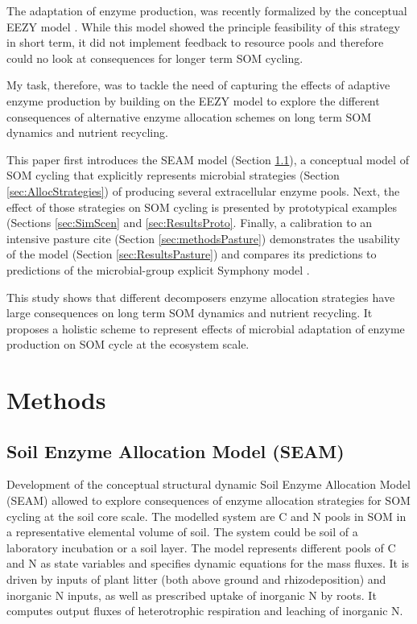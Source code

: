 The adaptation of enzyme production, was recently
formalized by the conceptual EEZY model \citep{Moorhead12}. While this model
showed the principle feasibility of this strategy in short term, it did not
implement feedback to resource pools and therefore could no look at
consequences for longer term SOM cycling. 

My task, therefore, was to tackle the need of capturing the effects of adaptive
enzyme production by building on the EEZY model to explore the different
consequences of alternative enzyme allocation schemes on long term SOM dynamics
and nutrient recycling.

This paper first introduces the SEAM model (Section \ref{sec:SEAM}), a
conceptual model of SOM cycling that explicitly represents microbial strategies
(Section \ref{sec:AllocStrategies}) of producing several extracellular enzyme
pools. Next, the effect of those strategies on SOM cycling is presented by
prototypical examples (Sections \ref{sec:SimScen} and \ref{sec:ResultsProto}.
Finally, a calibration to an intensive pasture cite (Section
\ref{sec:methodsPasture}) demonstrates the usability of the model (Section
\ref{sec:ResultsPasture}) and compares its predictions to predictions of the
microbial-group explicit Symphony model \citep{Perveen14}.

This study shows that different decomposers enzyme allocation strategies
have large consequences on long term SOM dynamics and nutrient recycling. It
proposes a holistic scheme to represent effects of microbial adaptation of
enzyme production on SOM cycle at the ecosystem scale.


\section{Methods}
\subsection{Soil Enzyme Allocation Model (SEAM)}
\label{sec:SEAM}

Development of the conceptual structural dynamic Soil Enzyme Allocation Model
(SEAM) allowed to explore consequences of enzyme allocation strategies for SOM
cycling at the soil core scale. The modelled system are C and N
pools in SOM in a representative elemental volume of soil. The
system could be soil of a laboratory incubation or a soil layer.
The model represents different pools of C and N as state variables
and specifies dynamic equations for the mass fluxes. It is driven by inputs of
plant litter (both above ground and rhizodeposition) and inorganic N
inputs, as well as prescribed uptake of inorganic N by roots.  It
computes output fluxes of heterotrophic respiration and leaching of inorganic
N.

